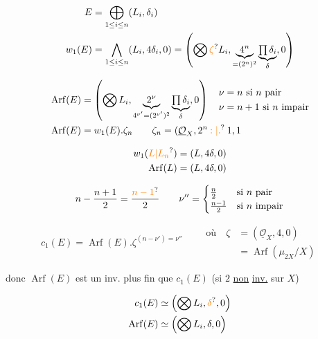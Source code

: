 \[
\begin{aligned}
E&=\bigoplus_{1\leq i\leq n}(L_i,\delta_i)\\
w_1(E)&=\bigwedge_{1\leq i\leq n}(L_i,4\delta_i,0)
=\left(\bigotimes\unsure{\vphantom{L}\zeta} L_i,\underbrace{4^n}_{=(2^n)^2}\underbrace{\textstyle\prod\delta_i}_{\delta},0\right)
\end{aligned}
\]

\[
\begin{aligned}
\operatorname{Arf}(E)&=\left(\bigotimes L_i,\underbrace{2^\nu}_{4^{\nu'}=(2^{\nu'})^2}\underbrace{\textstyle\prod\delta_i}_{\delta},0\right)
\quad\begin{aligned}\nu&=n\ \text{si $n$ pair}\\\nu&=n+1\ \text{si $n$ impair}\end{aligned}\\
\operatorname{Arf}(E)&=w_1(E).\zeta_n\qquad \zeta_n=(\underline{\mathcal O}_X,2^n\mathbin{\unsure{:|.}}1,1
\end{aligned}
\]


\[
\begin{aligned}
w_1(\unsure{L|L_n})&=(L,4\delta,0)\\
\operatorname{Arf}(L)&=(L,4\delta,0)
\end{aligned}
\]


\[
n-\frac{n+1}{2}=\frac{\unsure{n-1}}2\qquad
\nu''=\begin{cases}\frac n2&\text{si $n$ pair}\\ \frac{n-1}2&\text{si $n$ impair}\end{cases}
\]


\[
\boxed{c_1(E)=\operatorname{Arf}(E).\zeta^{(n-\nu')=\nu''}}
\qquad
\begin{aligned}
\text{où}\quad\zeta&=(\underline{\mathcal O}_X,4,0)\\
&=\operatorname{Arf}(\mu_{2X}/X)
\end{aligned}
\]

donc $\operatorname{Arf}(E)$ est un inv. plus fin que $c_1(E)$ (si $2$ \uline{non} \uline{inv.} sur $X$)

\[
\begin{aligned}
c_1(E)&\simeq\left(\bigotimes L_i,\unsure{\delta},0\right)\\
\operatorname{Arf}(E)&\simeq\left(\bigotimes L_i,\delta,0\right)
\end{aligned}
\]

